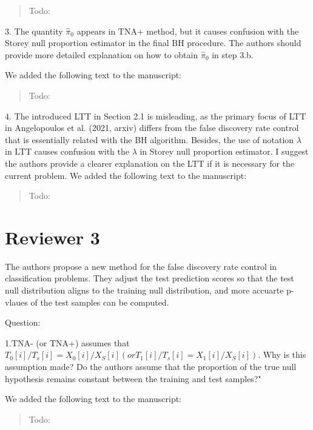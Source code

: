 \documentclass{article}
\newcommand{\response}[1]{\vspace*{1ex} \color{blue} \noindent #1 \color{black}
\vspace*{2ex}}
\newcommand{\edit}[1]{\begin{quotation}\color{red}\noindent #1
\color{black}\end{quotation}}
\begin{document}
\edit{Todo:}

3. The quantity $\hat{\pi}_0$ appears in TNA+ method, but it causes confusion with the Storey null proportion estimator in the final BH procedure.
The authors should provide more detailed explanation on how to obtain $\hat{\pi}_0$ in step 3.b.

\response{We added the following text to the manuscript:}

\edit{Todo:}

4. The introduced LTT in Section 2.1 is misleading, as the primary focus of LTT in Angelopoulos et al. (2021, arxiv) differs from the false discovery rate control that is essentially related with the BH algorithm.
Besides, the use of notation $\lambda$ in LTT causes confusion with the $\lambda$ in Storey null proportion estimator.
I suggest the authors provide a clearer explanation on the LTT if it is necessary for the current problem.
\response{We added the following text to the manuscript:}

\edit{Todo:}

\section*{Reviewer 3}

The authors propose a new method for the false discovery rate control in classification problems. They adjust the test prediction scores so that the test null distribution
aligns to the training null distribution, and more accuarte p-vlaues of the test samples can be computed.

Question:

1.TNA- (or TNA+) assumes that $T_0[i]/T_s[i]= X_0[i]/X_S[i] (or T_1[i]/T_s[i]= X_1[i]/X_S[i] )$. Why is this assumption made? Do the authors assume that the proportion of the true null hypothesis remains constant between the training and test samples?"

\response{We added the following text to the manuscript:}

\edit{Todo:}



\end{document}
